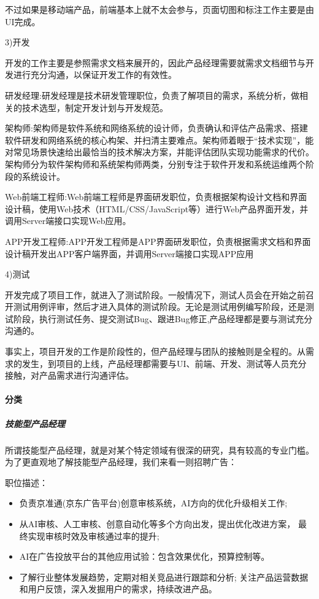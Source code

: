 \documentclass[letterpaper,11pt,english]{sphinxmanual}
\begin{document}
不过如果是移动端产品，前端基本上就不太会参与，页面切图和标注工作主要是由UI完成。

3)开发

开发的工作主要是参照需求文档来展开的，因此产品经理需要就需求文档细节与开发进行充分沟通，以保证开发工作的有效性。

研发经理:研发经理是技术研发管理职位，负责了解项目的需求，系统分析，做相关的技术选型，制定开发计划与开发规范。

架构师:架构师是软件系统和网络系统的设计师，负责确认和评估产品需求、搭建软件研发和网络系统的核心构架、并扫清主要难点。架构师着眼于“技术实现”，能对常见场景快速给出最恰当的技术解决方案，并能评估团队实现功能需求的代价。架构师分为软件架构师和系统架构师两类，分别专注于软件开发和系统运维两个阶段的系统设计。

Web前端工程师:Web前端工程师是界面研发职位，负责根据架构设计文档和界面设计稿，使用Web技术（HTML/CSS/JavaScript等）进行Web产品界面开发，并调用Server端接口实现Web应用。

APP开发工程师:APP开发工程师是APP界面研发职位，负责根据需求文档和界面设计稿开发出APP客户端界面，并调用Server端接口实现APP应用

4)测试

开发完成了项目工作，就进入了测试阶段。一般情况下，测试人员会在开始之前召开测试用例评审，然后才进入具体的测试阶段。无论是测试用例编写阶段，还是测试阶段，执行测试任务、提交测试Bug、跟进Bug修正,产品经理都是要与测试充分沟通的。

事实上，项目开发的工作是阶段性的，但产品经理与团队的接触则是全程的。从需求的发生，到项目的上线，产品经理都需要与UI、前端、开发、测试等人员充分接触，对产品需求进行沟通评估。


\paragraph{分类}
\label{\detokenize{chapter_introduction/PM:id14}}

\subparagraph{技能型产品经理}
\label{\detokenize{chapter_introduction/PM:id15}}
所谓技能型产品经理，就是对某个特定领域有很深的研究，具有较高的专业门槛。为了更直观地了解技能型产品经理，我们来看一则招聘广告：

职位描述：
\begin{itemize}
\item {} 
负责京准通(京东广告平台)创意审核系统，AI方向的优化升级相关工作;

\item {} 
从AI审核、人工审核、创意自动化等多个方向出发，提出优化改进方案，
最终实现审核时效及审核通过率的提升;

\item {} 
AI在广告投放平台的其他应用试验：包含效果优化，预算控制等。

\item {} 
了解行业整体发展趋势，定期对相关竞品进行跟踪和分析;
关注产品运营数据和用户反馈，深入发掘用户的需求，持续改进产品。

\end{itemize}
\end{document}
